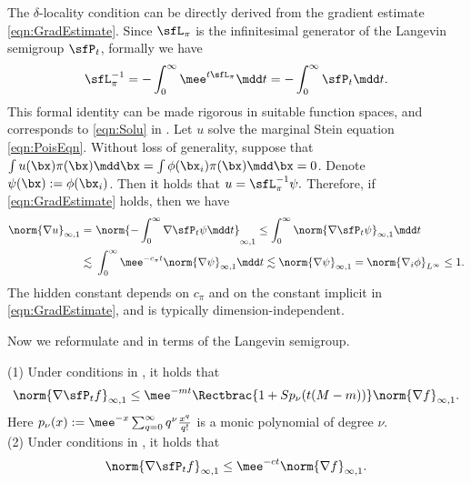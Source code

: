 \documentclass[11pt]{article}
\begin{document}
The $\delta$-locality condition can be directly derived from the gradient estimate \eqref{eqn:GradEstimate}.
Since $\sfL_\pi$ is the infinitesimal generator of the Langevin semigroup $\sfP_t$, formally we have 
\begin{equation}
    \sfL_\pi^{-1} = - \int_0^\infty \mee^{t\sfL_\pi} \mdd t = - \int_0^\infty \sfP_t \mdd t. 
\end{equation}
This formal identity can be made rigorous in suitable function spaces, and corresponds to \eqref{eqn:Solu} in .
Let $u$ solve the marginal Stein equation \eqref{eqn:PoisEqn}. Without loss of generality, suppose that $\int u(\bx) \pi(\bx) \mdd \bx = \int \phi(\bx_i) \pi(\bx) \mdd \bx = 0$.
Denote $\psi(\bx) := \phi(\bx_i)$. Then it holds that
\(
    u = \sfL_\pi^{-1} \psi. 
\)
Therefore, if \eqref{eqn:GradEstimate} holds, then we have 
\begin{equation}
\begin{split}
    \norm{\nabla u}_{\infty,1} =~& \norm{ - \int_0^\infty \nabla \sfP_t \psi \mdd t  }_{\infty,1} \le \int_0^\infty  \norm{ \nabla \sfP_t \psi }_{\infty,1} \mdd t \\
    \lesssim~& \int_0^\infty \mee^{-c_\pi t} \norm{\nabla \psi}_{\infty,1} \mdd t \lesssim \norm{\nabla \psi}_{\infty,1} = \norm{\nabla_i \phi}_{L^\infty} \le 1.
\end{split}
\end{equation}
The hidden constant depends on $c_\pi$ and on the constant implicit in \eqref{eqn:GradEstimate}, and is typically dimension-independent.

Now we reformulate  and  in terms of the Langevin semigroup. 

\begin{thm}
\label{thm:semigroup_loc}
\textup{(1)} Under conditions in , it holds that 
\begin{equation}
\label{eqn:semigroup_conv_cont}
    \norm{ \nabla \sfP_t f }_{\infty,1} \le \mee^{-mt} \Rectbrac{ 1+ S p_\nu ( t(M-m) ) } \norm{\nabla f}_{\infty,1}. 
\end{equation}
Here $p_\nu(x) := \mee^{-x} \sum_{q=0}^\infty q^\nu \frac{x^q}{q!}$ is a monic polynomial of degree $\nu$.
\\
\textup{(2)} Under conditions in , it holds that 
\begin{equation}
    \norm{ \nabla \sfP_t f }_{\infty,1} \le \mee^{-ct} \norm{\nabla f}_{\infty,1}.
\end{equation}
\end{thm}
\end{document}
